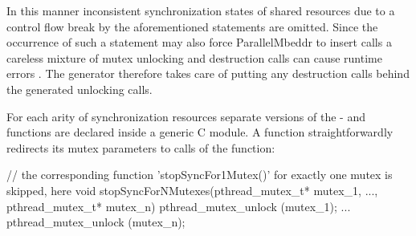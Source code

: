 In this manner inconsistent synchronization states of shared resources due to a control flow break by the aforementioned statements are omitted. Since the occurrence of such a statement may also force ParallelMbeddr to insert  calls a careless mixture of mutex unlocking and destruction calls can cause runtime errors \cite{Mutexes}. The generator therefore takes care of putting any destruction calls behind the generated unlocking calls.

For each arity of synchronization resources separate versions of the - and  functions are declared inside a generic C module. A  function straightforwardly redirects its mutex parameters to calls of the  function:
\begin{ccode}
// the corresponding function 'stopSyncFor1Mutex()' for exactly one mutex is skipped, here
void stopSyncForNMutexes(pthread_mutex_t* mutex_1, ..., pthread_mutex_t* mutex_n) { 
  pthread_mutex_unlock (mutex_1);
  ...
  pthread_mutex_unlock (mutex_n); 
}
\end{ccode}

